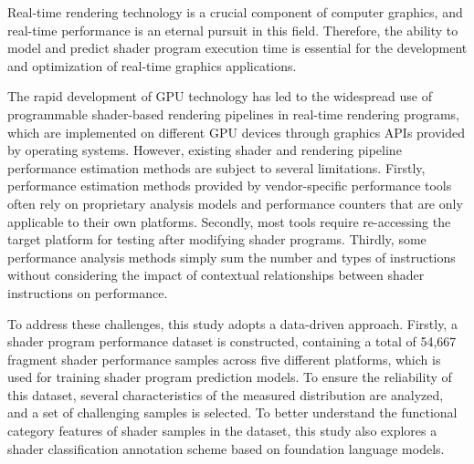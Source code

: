 \begin{abstract*}
Real-time rendering technology is a crucial component of computer graphics, and real-time performance is an eternal pursuit in this field. Therefore, the ability to model and predict shader program execution time is essential for the development and optimization of real-time graphics applications.

The rapid development of GPU technology has led to the widespread use of programmable shader-based rendering pipelines in real-time rendering programs, which are implemented on different GPU devices through graphics APIs provided by operating systems. However, existing shader and rendering pipeline performance estimation methods are subject to several limitations. Firstly, performance estimation methods provided by vendor-specific performance tools often rely on proprietary analysis models and performance counters that are only applicable to their own platforms. Secondly, most tools require re-accessing the target platform for testing after modifying shader programs. Thirdly, some performance analysis methods simply sum the number and types of instructions without considering the impact of contextual relationships between shader instructions on performance.

{\amend To address these challenges, this study adopts a data-driven approach. Firstly, a shader program performance dataset is constructed, containing a total of 54,667 fragment shader performance samples across five different platforms, which is used for training shader program prediction models. To ensure the reliability of this dataset, several characteristics of the measured distribution are analyzed, and a set of challenging samples is selected.} To better understand the functional category features of shader samples in the dataset, {\added this study also explores a shader classification annotation scheme based on foundation language models.}


\end{abstract*}
